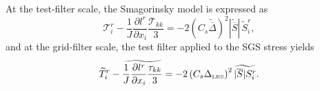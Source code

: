 \documentclass[final,3p]{elsarticle}
\begin{document}
At the test-filter scale, the Smagorinsky model is expressed as
\begin{equation}
    \mathcal{T}^r_i - \frac{1}{J} \frac{\partial l^r}{\partial x_i} \frac{\mathcal{T}_{kk}}{3}
    = -2 \left( C_s \widetilde{\overline{\Delta}} \right)^2
    |\widetilde{\overline{S}}| \, \widetilde{S}^r_i,
    \label{eq:testFilterstress}
\end{equation}
and at the grid-filter scale, the test filter applied to the SGS stress yields
\begin{equation}
    \widetilde{T}^r_i - \widetilde{\frac{1}{J} \frac{\partial l^r}{\partial x_i} \frac{\tau_{kk}}{3}} 
    = -2 \left( C_s \Delta_{\text{\tiny LES}} \right)^2 \widetilde{|\overline{S}| S^r_i}.
    \label{eq:gridFilterstress}
\end{equation}
\end{document}
